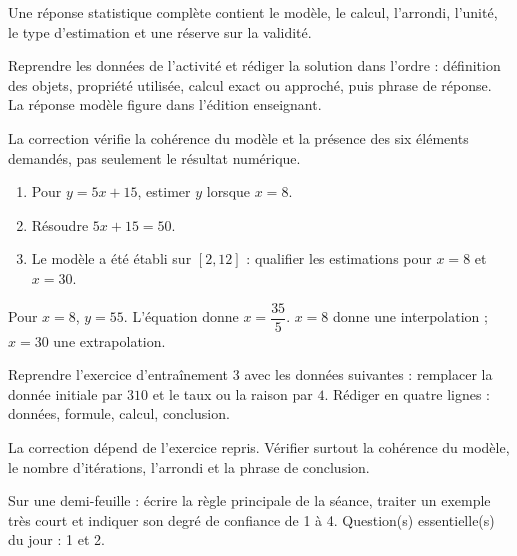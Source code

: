\begin{summary}Une réponse statistique complète contient le modèle, le calcul, l'arrondi, l'unité, le type d'estimation et une réserve sur la validité.\end{summary}

\begin{example}
Reprendre les données de l'activité et rédiger la solution dans l'ordre : définition des objets, propriété utilisée, calcul exact ou approché, puis phrase de réponse. La réponse modèle figure dans l'édition enseignant.
\end{example}
\begin{solution}La correction vérifie la cohérence du modèle et la présence des six éléments demandés, pas seulement le résultat numérique.\end{solution}

\begin{exercise}[essentiel]
\begin{enumerate}\item Pour $y=5x+15$, estimer $y$ lorsque $x=8$.\item Résoudre $5x+15=50$.\item Le modèle a été établi sur $[2,12]$ : qualifier les estimations pour $x=8$ et $x=30$.\end{enumerate}
\end{exercise}
\begin{solution}Pour $x=8$, $y=55$. L'équation donne $x=\dfrac{35}{5}$. $x=8$ donne une interpolation ; $x=30$ une extrapolation.\end{solution}


\begin{homework}Reprendre l'exercice d'entraînement 3 avec les données suivantes : remplacer la donnée initiale par $310$ et le taux ou la raison par $4$. Rédiger en quatre lignes : données, formule, calcul, conclusion.\end{homework}
\begin{solution}La correction dépend de l'exercice repris. Vérifier surtout la cohérence du modèle, le nombre d'itérations, l'arrondi et la phrase de conclusion.\end{solution}

\begin{exitticket}[3 minutes]Sur une demi-feuille : écrire la règle principale de la séance, traiter un exemple très court et indiquer son degré de confiance de 1 à 4. Question(s) essentielle(s) du jour : 1 et 2.\end{exitticket}

